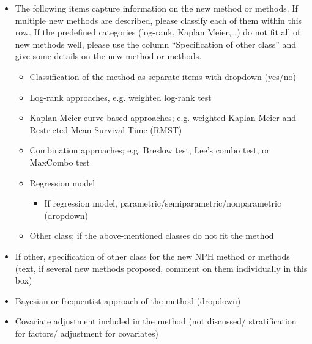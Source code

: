 \begin{itemize}
\item  The following items capture information on the new method or methods. If multiple new methods are described, please classify each of them within this row. If the predefined categories (log-rank, Kaplan Meier,{\dots}) do not fit all of new methods well, please use the column ``Specification of other class'' and give some details on the new method or methods. 
\noindent 

\begin{itemize}
\item  Classification of the method as separate items with dropdown (yes/no)

\end{itemize}

\noindent 

\begin{itemize}
\item  Log-rank approaches, e.g. weighted log-rank test

\item  Kaplan-Meier curve-based approaches; e.g. weighted Kaplan-Meier and Restricted Mean Survival Time (RMST)

\item  Combination approaches; e.g. Breslow test, Lee's combo test, or MaxCombo test

\item  Regression model 

\begin{itemize}
\item  If regression model, parametric/semiparametric/nonparametric (dropdown)
\end{itemize}

\item  Other class; if the above-mentioned classes do not fit the method
\end{itemize}

\item  If other, specification of other class for the new NPH method or methods (text, if several new methods proposed, comment on them individually in this box)

\item  Bayesian or frequentist approach of the method (dropdown)

\item  Covariate adjustment included in the method (not discussed/ stratification for factors/ adjustment for covariates)


\end{itemize}
